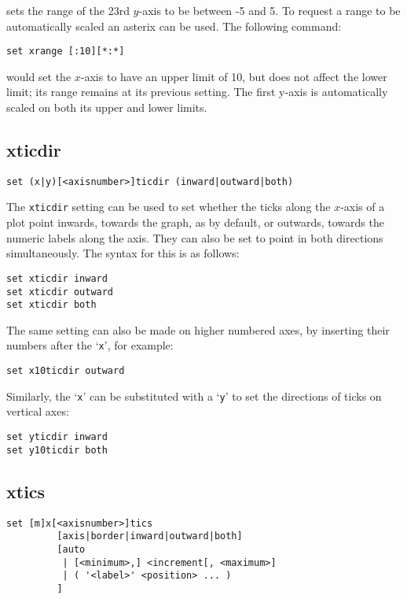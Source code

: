 \noindent sets the range of the 23rd $y$-axis to be between -5 and 5.  To
request a range to be automatically scaled an asterix can be used.  The
following command:

\begin{verbatim}
set xrange [:10][*:*]
\end{verbatim}

\noindent would set the $x$-axis to have an upper limit of 10, but does not
affect the lower limit; its range remains at its previous setting.  The first
y-axis is automatically scaled on both its upper and lower limits.

\subsection{xticdir}

\begin{verbatim}
set (x|y)[<axisnumber>]ticdir (inward|outward|both)
\end{verbatim}

The {\tt xticdir} setting can be used to set whether the ticks along the
$x$-axis of a plot point inwards, towards the graph, as by default, or outwards,
towards the numeric labels along the axis. They can also be set to point in both
directions simultaneously. The syntax for this is as follows:

\begin{verbatim}
set xticdir inward 
set xticdir outward 
set xticdir both
\end{verbatim}

The same setting can also be made on higher numbered axes, by inserting their
numbers after the `{\tt x}', for example:

\begin{verbatim}
set x10ticdir outward
\end{verbatim}

Similarly, the `{\tt x}' can be substituted with a `{\tt y}' to set the directions of ticks
on vertical axes:

\begin{verbatim}
set yticdir inward
set y10ticdir both
\end{verbatim}

\subsection{xtics}

\begin{verbatim}
set [m]x[<axisnumber>]tics 
         [axis|border|inward|outward|both] 
         [auto 
          | [<minimum>,] <increment[, <maximum>] 
          | ( '<label>' <position> ... ) 
         ] 
\end{verbatim}

